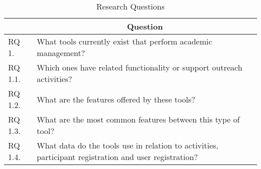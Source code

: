 \begin{table}
  \centering
  \caption{Research Questions}
  \label{tab:research-questions}
  \footnotesize
  \begin{tabular}{l|p{12cm}}
    \bottomrule
    \rowcolor[rgb]{0.753,0.753,0.753} \multicolumn{1}{c|}{\textbf{ID}} & \multicolumn{1}{c}{\textbf{Question}}                                                                 \\
    \hline
    \rowcolor[rgb]{0.898,0.898,0.898} RQ 1.                            & What tools currently exist that perform academic management?                                          \\
    RQ 1.1.                                                            & Which ones have related functionality or support outreach activities?                                 \\
    \rowcolor[rgb]{0.898,0.898,0.898} RQ 1.2.                          & What are the features offered by these tools?                                                         \\
    RQ 1.3.                                                            & What are the most common features between this type of tool?                                          \\
    \rowcolor[rgb]{0.898,0.898,0.898} RQ 1.4.                          & What data do the tools use in relation to activities, participant registration and user registration? \\
    \toprule
  \end{tabular}
\end{table}